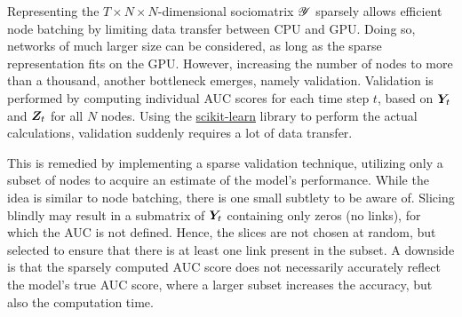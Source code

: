     Representing the $T\times N\times N$-dimensional sociomatrix $\bm{\mathscr{Y}}$ sparsely allows efficient node batching by limiting data transfer between CPU and GPU. Doing so, networks of much larger size can be considered, as long as the sparse representation fits on the GPU. However, increasing the number of nodes to more than a thousand, another bottleneck emerges, namely validation. Validation is performed by computing individual AUC scores for each time step $t$, based on $\bm{Y}_t$ and $\bm{Z}_t$ for all $N$ nodes. Using the \href{https://scikit-learn.org/stable/}{scikit-learn} library to perform the actual calculations, validation suddenly requires a lot of data transfer.
    
    This is remedied by implementing a sparse validation technique, utilizing only a subset of nodes to acquire an estimate of the model's performance. While the idea is similar to node batching, there is one small subtlety to be aware of. Slicing blindly may result in a submatrix of $\bm{Y}_t$ containing only zeros (no links), for which the AUC is not defined. Hence, the slices are not chosen at random, but selected to ensure that there is at least one link present in the subset.
    A downside is that the sparsely computed AUC score does not necessarily accurately reflect the model's true AUC score, where a larger subset increases the accuracy, but also the computation time.
    